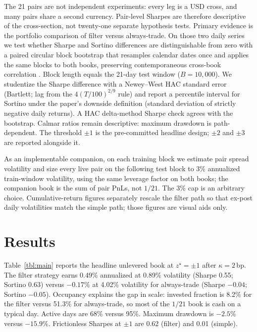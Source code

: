 \documentclass[11pt,a4paper]{article}
\begin{document}
The 21 pairs are not independent experiments: every leg is a USD cross, and many pairs share
a second currency. Pair-level Sharpes are therefore descriptive of the cross-section, not
twenty-one separate hypothesis tests. Primary evidence is the portfolio comparison of filter
versus always-trade. On those two daily series we test whether Sharpe and Sortino differences
are distinguishable from zero with a paired circular block bootstrap that resamples calendar
dates once and applies the same blocks to both books, preserving contemporaneous cross-book
correlation \parencite{ledoitwolf2008}. Block length equals the 21-day test window
($B=10{,}000$). We studentize the Sharpe difference with a Newey--West HAC standard error
\parencite{neweywest1987} (Bartlett; lag from the $4(T/100)^{2/9}$ rule) and report a
percentile interval for Sortino under the paper's downside definition (standard deviation of
strictly negative daily returns). A HAC delta-method Sharpe check
\parencite{jobsonkorkie1981,memmel2003} agrees with the bootstrap. Calmar ratios remain
descriptive: maximum drawdown is path-dependent. The threshold $\pm 1$ is the pre-committed
headline design; $\pm 2$ and $\pm 3$ are reported alongside it.

As an implementable companion, on each training block we estimate pair spread volatility and
size every live pair on the following test block to 3\% annualized train-window volatility,
using the same leverage factor on both books; the companion book is the sum of pair PnLs, not
$1/21$. The 3\% cap is an arbitrary choice. Cumulative-return figures separately rescale the
filter path so that ex-post daily volatilities match the simple path; those figures are
visual aids only.

\section{Results}

Table~\ref{tbl:main} reports the headline unlevered book at $z^{\star}=\pm 1$ after
$\kappa=2$\,bp. The filter strategy earns 0.49\% annualized at 0.89\% volatility (Sharpe
0.55; Sortino 0.63) versus $-0.17\%$ at 4.02\% volatility for always-trade (Sharpe $-0.04$;
Sortino $-0.05$). Occupancy explains the gap in scale: invested fraction is 8.2\% for the
filter versus 51.3\% for always-trade, so most of the $1/21$ book is cash on a typical day.
Active days are 68\% versus 95\%. Maximum drawdown is $-2.5\%$ versus $-15.9\%$. Frictionless
Sharpes at $\pm 1$ are 0.62 (filter) and 0.01 (simple).
\end{document}
